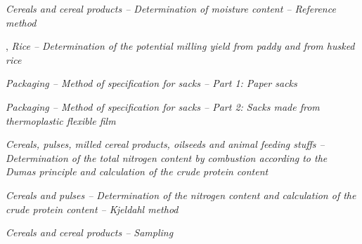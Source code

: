 \begin{thebibliography}{3}


\textit{Cereals and cereal products -- Determination of moisture content -- Reference method}

,
\textit{Rice -- Determination of the potential milling yield from paddy and from husked rice}

\textit{Packaging -- Method of specification for sacks -- Part 1: Paper sacks}

\textit{Packaging -- Method of specification for sacks -- Part 2: Sacks made from thermoplastic flexible film}

\textit{Cereals, pulses, milled cereal products, oilseeds and animal feeding stuffs -- Determination of the total nitrogen content by combustion according to the Dumas principle and calculation of the crude protein content}

\textit{Cereals and pulses -- Determination of the nitrogen content and calculation of the crude protein content -- Kjeldahl method}

\textit{Cereals and cereal products -- Sampling}

\end{thebibliography}
